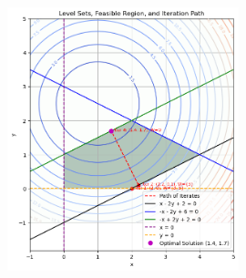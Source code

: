 \documentclass[12pt]{article}
\begin{document}
\begin{figure}[ht]
    \centering
    \includegraphics[width=0.6\textwidth]{./img/iteration.png}
\end{figure}
\end{document}
